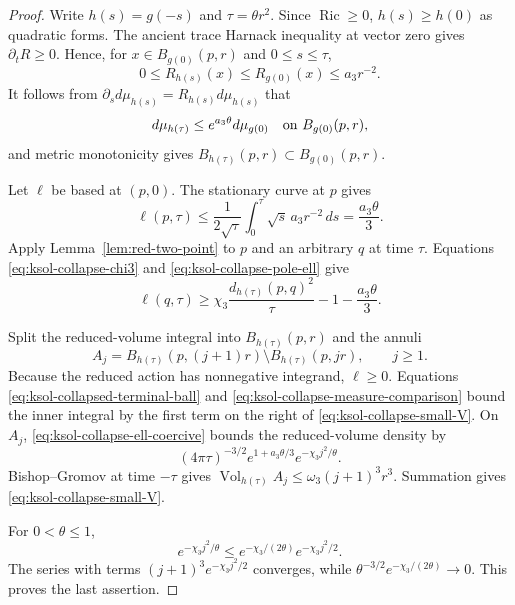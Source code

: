 \documentclass[10pt]{coll-l}
\theoremstyle{definition}
\theoremstyle{remark}
\numberwithin{section}{chapter}
\numberwithin{equation}{chapter}
\newcommand{\Ric}{\operatorname{Ric}}
\newcommand{\Vol}{\operatorname{Vol}}
\begin{document}
\begin{proof}
Write $h(s)=g(-s)$ and $\tau=\theta r^2$.  Since $\Ric\geq0$,
$h(s)\geq h(0)$ as quadratic forms.  The ancient trace Harnack inequality
at vector zero gives $\partial_tR\geq0$.  Hence, for
$x\in B_{g(0)}(p,r)$ and $0\leq s\leq\tau$,
\[
              0\leq R_{h(s)}(x)\leq R_{g(0)}(x)\leq a_3r^{-2}.
\]
It follows from $\partial_s d\mu_{h(s)}=R_{h(s)}d\mu_{h(s)}$ that
\begin{equation}
 d\mu_{h(\tau)}\leq e^{a_3\theta}d\mu_{g(0)}
 \quad\hbox{on }B_{g(0)}(p,r),                         \label{eq:ksol-collapse-measure-comparison}
\end{equation}
and metric monotonicity gives
$B_{h(\tau)}(p,r)\subset B_{g(0)}(p,r)$.

Let $\ell$ be based at $(p,0)$.  The stationary curve at $p$ gives
\begin{equation}
 \ell(p,\tau)
 \leq\frac1{2\sqrt\tau}\int_0^\tau\sqrt s\,a_3r^{-2}\,ds
 =\frac{a_3\theta}{3}.                                 \label{eq:ksol-collapse-pole-ell}
\end{equation}
Apply Lemma~\ref{lem:red-two-point} to $p$ and an arbitrary $q$ at time
$\tau$.  Equations \eqref{eq:ksol-collapse-chi3} and
\eqref{eq:ksol-collapse-pole-ell} give
\begin{equation}
 \ell(q,\tau)\geq
 \chi_3\frac{d_{h(\tau)}(p,q)^2}{\tau}
       -1-\frac{a_3\theta}{3}.                         \label{eq:ksol-collapse-ell-coercive}
\end{equation}

Split the reduced-volume integral into $B_{h(\tau)}(p,r)$ and the annuli
\[
 A_j=B_{h(\tau)}(p,(j+1)r)\setminus B_{h(\tau)}(p,jr),
 \qquad j\geq1.
\]
Because the reduced action has nonnegative integrand, $\ell\geq0$.
Equations \eqref{eq:ksol-collapsed-terminal-ball} and
\eqref{eq:ksol-collapse-measure-comparison} bound the inner integral by
the first term on the right of \eqref{eq:ksol-collapse-small-V}.  On $A_j$,
\eqref{eq:ksol-collapse-ell-coercive} bounds the reduced-volume density by
\[
 (4\pi\tau)^{-3/2}
 e^{1+a_3\theta/3}e^{-\chi_3j^2/\theta}.
\]
Bishop--Gromov at time $-\tau$ gives
$\Vol_{h(\tau)}A_j\leq\omega_3(j+1)^3r^3$.  Summation gives
\eqref{eq:ksol-collapse-small-V}.

For $0<\theta\leq1$,
\[
 e^{-\chi_3j^2/\theta}
 \leq e^{-\chi_3/(2\theta)}e^{-\chi_3j^2/2}.
\]
The series with terms $(j+1)^3e^{-\chi_3j^2/2}$ converges, while
$\theta^{-3/2}e^{-\chi_3/(2\theta)}\to0$.  This proves the last assertion.
\end{proof}
\end{document}
